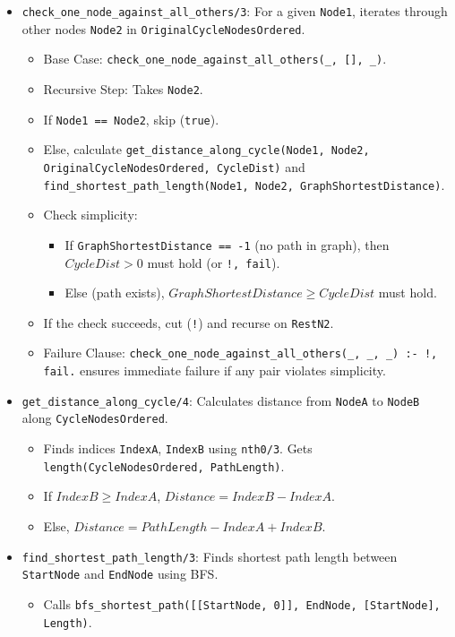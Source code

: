 \documentclass[12pt,a4paper]{article}
\begin{document}
\begin{itemize}
\begin{itemize}
\end{itemize}
\item \texttt{check\_one\_node\_against\_all\_others/3}: For a given \texttt{Node1}, iterates through other nodes \texttt{Node2} in \texttt{OriginalCycleNodesOrdered}.
\begin{itemize}
\item Base Case: \texttt{check\_one\_node\_against\_all\_others(\_, [], \_)}.
\item Recursive Step: Takes \texttt{Node2}.
\item If \texttt{Node1 == Node2}, skip (\texttt{true}).
\item Else, calculate \texttt{get\_distance\_along\_cycle(Node1, Node2, OriginalCycleNodesOrdered, CycleDist)} and \texttt{find\_shortest\_path\_length(Node1, Node2, GraphShortestDistance)}.
\item Check simplicity:
\begin{itemize}
\item If \texttt{GraphShortestDistance == -1} (no path in graph), then $CycleDist > 0$ 
 must hold (or \texttt{!, fail}).
\item Else (path exists), $GraphShortestDistance \ge CycleDist$ 
 must hold.
\end{itemize}
\item If the check succeeds, cut (\texttt{!}) and recurse on \texttt{RestN2}.
\item Failure Clause: \texttt{check\_one\_node\_against\_all\_others(\_, \_, \_) :- !, fail.} ensures immediate failure if any pair violates simplicity.
\end{itemize}
\item \texttt{get\_distance\_along\_cycle/4}: Calculates distance from \texttt{NodeA} to \texttt{NodeB} along \texttt{CycleNodesOrdered}.
\begin{itemize}
\item Finds indices \texttt{IndexA}, \texttt{IndexB} using \texttt{nth0/3}. Gets \texttt{length(CycleNodesOrdered, PathLength)}.
\item If $IndexB \ge IndexA$, $Distance = IndexB - IndexA$. 
\item Else, $Distance = PathLength - IndexA + IndexB$. 
\end{itemize}
\item \texttt{find\_shortest\_path\_length/3}: Finds shortest path length between \texttt{StartNode} and \texttt{EndNode} using BFS.
\begin{itemize}
\item Calls \texttt{bfs\_shortest\_path([[StartNode, 0]], EndNode, [StartNode], Length)}.

\end{itemize}
\end{itemize}
\end{document}
